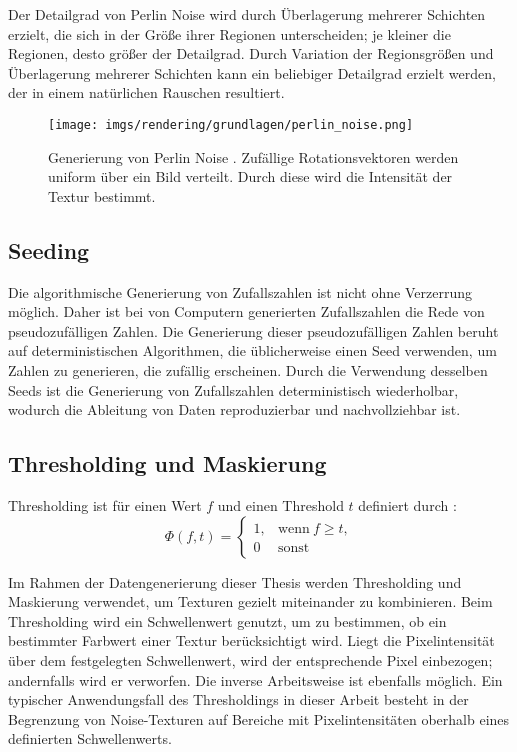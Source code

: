 Der Detailgrad von Perlin Noise wird durch Überlagerung mehrerer Schichten erzielt, die sich in der Größe ihrer Regionen unterscheiden; je kleiner die Regionen, desto größer der Detailgrad. Durch Variation der Regionsgrößen und Überlagerung mehrerer Schichten kann ein beliebiger Detailgrad erzielt werden, der in einem natürlichen Rauschen resultiert.

\begin{figure}
    \centering
    \texttt{[image: imgs/rendering/grundlagen/perlin\_noise.png]}
    \caption{Generierung von Perlin Noise \cite{perlin_noise_img}. Zufällige Rotationsvektoren werden uniform über ein Bild verteilt. Durch diese wird die Intensität der Textur bestimmt.}
    \label{img:perlin_noise_generation}
\end{figure}

\subsection{Seeding}
\label{sec:seeding}

Die algorithmische Generierung von Zufallszahlen ist nicht ohne Verzerrung möglich. Daher ist bei von Computern generierten Zufallszahlen die Rede von pseudozufälligen Zahlen. Die Generierung dieser pseudozufälligen Zahlen beruht auf deterministischen Algorithmen, die üblicherweise einen Seed verwenden, um Zahlen zu generieren, die zufällig erscheinen. Durch die Verwendung desselben Seeds ist die Generierung von Zufallszahlen deterministisch wiederholbar, wodurch die Ableitung von Daten reproduzierbar und nachvollziehbar ist.

\vspace*{0.1cm}

\subsection{Thresholding und Maskierung}
\label{sec:thresholding_maskierung}

Thresholding ist für einen Wert $f$ und einen Threshold $t$ definiert durch \cite{cv_general}:
\[\Phi(f, t) = \begin{cases}
        1, & \text{wenn}~f \geq t, \\
        0  & \text{sonst}
    \end{cases}\]

Im Rahmen der Datengenerierung dieser Thesis werden Thresholding und Maskierung verwendet, um Texturen gezielt miteinander zu kombinieren. Beim Thresholding wird ein Schwellenwert genutzt, um zu bestimmen, ob ein bestimmter Farbwert einer Textur berücksichtigt wird. Liegt die Pixelintensität über dem festgelegten Schwellenwert, wird der entsprechende Pixel einbezogen; andernfalls wird er verworfen. Die inverse Arbeitsweise ist ebenfalls möglich. Ein typischer Anwendungsfall des Thresholdings in dieser Arbeit besteht in der Begrenzung von Noise-Texturen auf Bereiche mit Pixelintensitäten oberhalb eines definierten Schwellenwerts.

